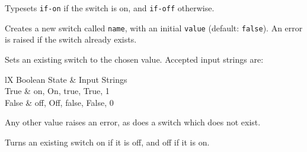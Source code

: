 		{
			Typesets \texttt{if-on} if the switch is on, and \texttt{if-off} otherwise.

		}
		{
			Creates a new switch called \texttt{name}, with an initial \texttt{value} (default: \texttt{false}). An error is raised if the switch already exists.
		}
		{
			Sets an existing switch to the chosen value. Accepted input strings are:
			\begin{RpgTable}{lX}
				Boolean State & Input Strings
				\\
				True & on, On, true, True, 1
				\\
				False & off, Off, false, False, 0
			\end{RpgTable}

			Any other value raises an error, as does a switch which does not exist.
		}
		{
			Turns an existing switch on if it is off, and off if it is on.

		}

